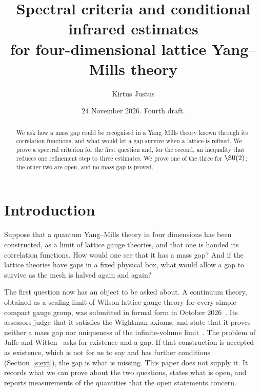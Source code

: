 
\usepackage{tikz}
\usetikzlibrary{positioning,arrows.meta}
\title[Spectral criteria and conditional infrared estimates]{Spectral criteria and conditional infrared estimates\\ for four-dimensional lattice Yang--Mills theory}
\author{Kirtus Justus}
\address{Theoretical Physicist, Port Coquitlam, British Columbia, Canada}
\date{24 November 2026. Fourth draft.}

\begin{abstract}
We ask how a mass gap could be recognised in a Yang--Mills theory known through its correlation functions,
and what would let a gap survive when a lattice is refined. We prove a spectral criterion for the first
question and, for the second, an inequality that reduces one refinement step to three estimates. We prove one
of the three for $\SU(2)$; the other two are open, and no mass gap is proved.
\end{abstract}
\maketitle
\tableofcontents

\section{Introduction}\label{s:intro}

Suppose that a quantum Yang--Mills theory in four dimensions has been constructed, as a limit of lattice
gauge theories, and that one is handed its correlation functions. How would one see that it has a mass gap?
And if the lattice theories have gaps in a fixed physical box, what would allow a gap to survive as the mesh is
halved again and again?

The first question now has an object to be asked about. A continuum theory, obtained as a scaling limit of
Wilson lattice gauge theory for every simple compact gauge group, was submitted in formal form in October
2026~\cite{OAI}. Its assessors judge that it satisfies the Wightman axioms, and state that it proves neither a
mass gap nor uniqueness of the infinite-volume limit~\cite[p.~1]{YMG}. The problem of Jaffe and
Witten~\cite[\S4]{JW} asks for existence and a gap. If that construction is accepted as existence, which is
not for us to say and has further conditions (Section~\ref{s:ext}), the gap is what is missing. This paper
does not supply it. It records what we can prove about the two questions, states what is open, and reports measurements of
the quantities that the open statements concern.

